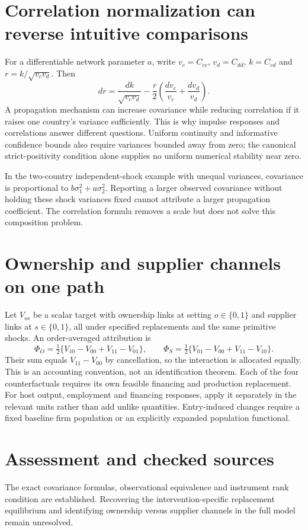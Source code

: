 \documentclass[11pt]{article}
\begin{document}
\section{Correlation normalization can reverse intuitive comparisons}
For a differentiable network parameter $a$, write $v_c=C_{cc}$, $v_d=C_{dd}$, $k=C_{cd}$ and $r=k/\sqrt{v_cv_d}$. Then
\[
 dr=\frac{dk}{\sqrt{v_cv_d}}
       -\frac r2\left(\frac{dv_c}{v_c}+\frac{dv_d}{v_d}\right).
\]
A propagation mechanism can increase covariance while reducing correlation if it raises one country's variance sufficiently. This is why impulse responses and correlations answer different questions. Uniform continuity and informative confidence bounds also require variances bounded away from zero; the canonical strict-positivity condition alone supplies no uniform numerical stability near zero.

In the two-country independent-shock example with unequal variances, covariance is proportional to $b\sigma_1^2+a\sigma_2^2$. Reporting a larger observed covariance without holding these shock variances fixed cannot attribute a larger propagation coefficient. The correlation formula removes a scale but does not solve this composition problem.

\section{Ownership and supplier channels on one path}
Let $V_{os}$ be a scalar target with ownership links at setting $o\in\{0,1\}$ and supplier links at $s\in\{0,1\}$, all under specified replacements and the same primitive shocks. An order-averaged attribution is
\[
 \Phi_O=\tfrac12\{V_{10}-V_{00}+V_{11}-V_{01}\},\qquad
 \Phi_S=\tfrac12\{V_{01}-V_{00}+V_{11}-V_{10}\}.
\]
Their sum equals $V_{11}-V_{00}$ by cancellation, so the interaction is allocated equally. This is an accounting convention, not an identification theorem. Each of the four counterfactuals requires its own feasible financing and production replacement. For host output, employment and financing responses, apply it separately in the relevant units rather than add unlike quantities. Entry-induced changes require a fixed baseline firm population or an explicitly expanded population functional.

\section{Assessment and checked sources}
The exact covariance formulas, observational equivalence and instrument rank condition are established. Recovering the intervention-specific replacement equilibrium and identifying ownership versus supplier channels in the full model remain unresolved.
\end{document}
